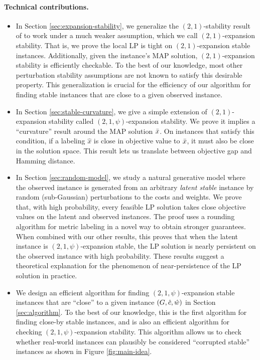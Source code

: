 \paragraph{Technical contributions.}
\begin{itemize}
    \item In Section \ref{sec:expansion-stability}, we generalize the $(2,1)$-stability result of \citet{LanSonVij18} to work under a much weaker assumption, which we call $(2,1)$-expansion stability. That is, we prove the local LP is tight on $(2,1)$-expansion stable instances. 
    Additionally, given the instance's MAP solution, $(2,1)$-expansion stability is efficiently checkable. To the best of our knowledge, most other perturbation stability assumptions are not known to satisfy this desirable property. This generalization is crucial for the efficiency of our algorithm for finding stable instances that are close to a given observed instance.
    \item In Section \ref{sec:stable-curvature}, we give a simple extension of $(2,1)$-expansion stability called $(2,1,\psi)$-expansion stability. We prove it implies a ``curvature'' result around the MAP solution $\bar{x}$. On instances that satisfy this condition, if a labeling $\hat{x}$ is close in objective value to $\bar{x}$, it must also be close in the solution space. This result lets us translate between objective gap and Hamming distance.
    \item In Section \ref{sec:random-model}, we study a natural generative model where the observed instance is generated from an arbitrary {\em latent stable} instance by random (sub-Gaussian) perturbations to the costs and weights. We prove that, with high probability, every feasible LP solution takes close objective values on the latent and observed instances. The proof uses a rounding algorithm for metric labeling in a novel way to obtain stronger guarantees. When combined with our other results, this proves that when the latent instance is $(2,1,\psi)$-expansion stable, the LP solution is nearly persistent on the observed instance with high probability. These results suggest a theoretical explanation for the phenomenon of near-persistence of the LP solution in practice. 
    \item We design an efficient algorithm for finding $(2,1,\psi)$-expansion stable instances that are ``close'' to a given instance $(G,\hat{c},\hat{w})$ in Section \ref{sec:algorithm}. To the best of our knowledge, this is the first algorithm for finding close-by stable instances, and is also an efficient algorithm for checking $(2,1,\psi)$-expansion stability. This algorithm allows us to check whether real-world instances can plausibly be considered ``corrupted stable'' instances as shown in Figure \ref{fig:main-idea}.

\end{itemize}
